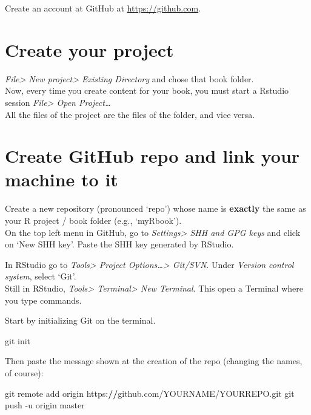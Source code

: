 \documentclass[]{book}
\newenvironment{Shaded}{}{}
\newcommand{\ErrorTok}[1]{\textcolor[rgb]{1.00,0.00,0.00}{\textbf{#1}}}
\newcommand{\NormalTok}[1]{#1}
\newcommand{\OperatorTok}[1]{\textcolor[rgb]{0.40,0.40,0.40}{#1}}
\theoremstyle{definition}
\theoremstyle{definition}
\theoremstyle{definition}
\theoremstyle{remark}
\begin{document}
Create an account at GitHub at
\href{https://github.com/join}{https://github.com}.

\hypertarget{create-your-project}{%
\section{Create your project}\label{create-your-project}}

\emph{File\textgreater{} New project\textgreater{} Existing Directory}
and chose that book folder.\\
Now, every time you create content for your book, you must start a
Rstudio session \emph{File\textgreater{} Open Project\ldots{}}\\
All the files of the project are the files of the folder, and vice
versa.

\hypertarget{create-github-repo-and-link-your-machine-to-it}{%
\section{Create GitHub repo and link your machine to
it}\label{create-github-repo-and-link-your-machine-to-it}}

Create a new repository (pronounced `repo') whose name is
\textbf{exactly} the same as your R project / book folder (e.g.,
`myRbook').\\
On the top left menu in GitHub, go to \emph{Settings\textgreater{} SHH
and GPG keys} and click on `New SHH key'. Paste the SHH key generated by
RStudio.

In RStudio go to \emph{Tools\textgreater{} Project
Options\ldots\textgreater{} Git/SVN}. Under \emph{Version control
system}, select `Git'.\\
Still in RStudio, \emph{Tools\textgreater{} Terminal\textgreater{} New
Terminal}. This open a Terminal where you type commands.

Start by initializing Git on the terminal.

\begin{Shaded}
\begin{Highlighting}[]
\NormalTok{git init}
\end{Highlighting}
\end{Shaded}

Then paste the message shown at the creation of the repo (changing the
names, of course):

\begin{Shaded}
\begin{Highlighting}[]
\NormalTok{git remote add origin https}\OperatorTok{:}\ErrorTok{//}\NormalTok{github.com}\OperatorTok{/}\NormalTok{YOURNAME}\OperatorTok{/}\NormalTok{YOURREPO.git}
\NormalTok{git push }\OperatorTok{-}\NormalTok{u origin master}
\end{Highlighting}
\end{Shaded}
\end{document}

